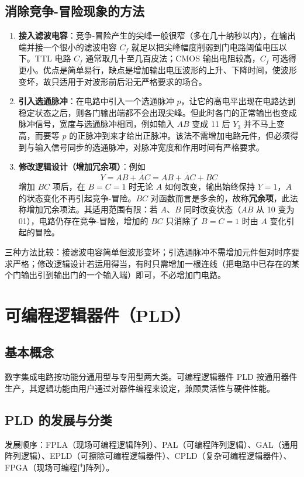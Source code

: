 \subsection{消除竞争-冒险现象的方法}
\begin{enumerate}
    \item \textbf{接入滤波电容}：竞争-冒险产生的尖峰一般很窄（多在几十纳秒以内），在输出端并接一个很小的滤波电容 \(C_f\) 就足以把尖峰幅度削弱到门电路阈值电压以下。TTL 电路 \(C_f\) 通常取几十至几百皮法；CMOS 输出电阻较高，\(C_f\) 可选得更小。优点是简单易行，缺点是增加输出电压波形的上升、下降时间，使波形变坏，故只适用于对波形前后沿无严格要求的场合。
    \item \textbf{引入选通脉冲}：在电路中引入一个选通脉冲 \(p\)，让它的高电平出现在电路达到稳定状态之后，则各门输出端都不会出现尖峰。但此时各门的正常输出也变成脉冲信号，宽度与选通脉冲相同，例如输入 \(AB\) 变成 11 后 \(Y_3\) 并不马上变高，而要等 \(p\) 的正脉冲到来才给出正脉冲。该法不需增加电路元件，但必须得到与输入信号同步的选通脉冲，对脉冲宽度和作用时间有严格要求。
    \item \textbf{修改逻辑设计（增加冗余项）}：例如
    \[
    Y=AB+\overline{A}C=AB+\overline{A}C+BC
    \]
    增加 \(BC\) 项后，在 \(B=C=1\) 时无论 \(A\) 如何改变，输出始终保持 \(Y=1\)，\(A\) 的状态变化不再引起竞争-冒险。\(BC\) 对函数而言是多余的，故称\textbf{冗余项}，此法称增加冗余项法。其适用范围有限：若 \(A\)、\(B\) 同时改变状态（\(AB\) 从 10 变为 01），电路仍存在竞争-冒险，增加的 \(BC\) 只消除了 \(B=C=1\) 时由 \(A\) 变化引起的冒险。
\end{enumerate}
三种方法比较：接滤波电容简单但波形变坏；引选通脉冲不需增加元件但对时序要求严格；修改逻辑设计若运用得当，有时只需增加一根连线（把电路中已存在的某个门输出引到输出门的一个输入端）即可，不必增加门电路。

\section{可编程逻辑器件（PLD）}
\subsection{基本概念}
数字集成电路按功能分通用型与专用型两大类。可编程逻辑器件 PLD 按通用器件生产，其逻辑功能由用户通过对器件编程来设定，兼顾灵活性与硬件性能。

\subsection{PLD 的发展与分类}
发展顺序：FPLA（现场可编程逻辑阵列）、PAL（可编程阵列逻辑）、GAL（通用阵列逻辑）、EPLD（可擦除可编程逻辑器件）、CPLD（复杂可编程逻辑器件）、FPGA（现场可编程门阵列）。

